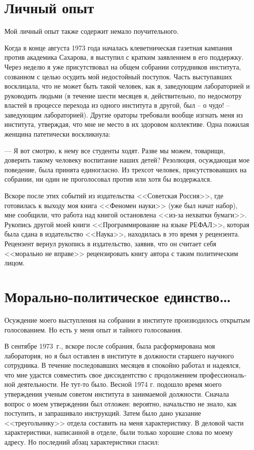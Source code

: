 \documentclass{book}
\begin{document}
\section{Личный опыт}

Мой личный опыт также содержит немало поучительного.

Когда в конце августа 1973 года началась клеветническая газетная кампания против академика Сахарова, я выступил с кратким заявлением в его поддержку. Через неделю я уже присутствовал на общем собрании сотрудников института, созванном с целью осудить мой недостойный поступок. Часть выступавших восклицала, что не может быть такой человек, как я, заведующим лабораторией и руководить людьми (в течение шести месяцев я, действительно, по недосмотру властей в процессе перехода из одного института в другой, был -- о чудо! -- заведующим лабораторией). Другие ораторы требовали вообще изгнать меня из института, утверждая, что мне не место в их здоровом коллективе. Одна пожилая женщина патетически воскликнула:

--- Я вот смотрю, к нему все студенты ходят. Разве мы можем, товарищи, доверить такому человеку воспитание наших детей?
Резолюция, осуждающая мое поведение, была принята единогласно. Из трехсот человек, присутствовавших на собрании, ни один не проголосовал против или хотя бы воздержался.

Вскоре после этих событий из издательства <<Советская Россия>>, где готовилась к выходу моя книга <<Феномен науки>> (уже был начат набор), мне сообщили, что работа над книгой остановлена <<из-за нехватки бумаги>>. Рукопись другой моей книги <<Программирование на языке РЕФАЛ>>, которая была сдана в издательство <<Наука>>, находилась в это время у рецензента. Рецензент вернул рукопись в издательство, заявив, что он считает себя <<морально не вправе>> рецензировать книгу автора с таким политическим лицом.


\section{Морально-политическое единство\ldots}


Осуждение моего выступления на собрании в институте производилось открытым голосованием. Но есть у меня опыт и тайного голосования.

В сентябре 1973~г., вскоре после собрания, была расформиро­вана моя лаборатория, но я был оставлен в институте в долж­ности старшего научного сотрудника. В течение последовавших месяцев я спокойно работал и надеялся, что мне удастся совместить свое диссидентство с продолжением профессиональ­ной деятельности. Не тут-то было. Весной 1974 г. подошло время моего утверждения ученым советом института в занима­емой должности. Сначала вопрос о моем утверждении был от­ложен: вероятно, начальство не знало, как поступить, и запра­шивало инструкций. Затем было дано указание <<треугольнику>> отдела составить на меня характеристику.
В деловой части характеристики, написанной в отделе, были только хорошие слова по моему адресу. Но последний абзац характеристики гласил:
\end{document}

